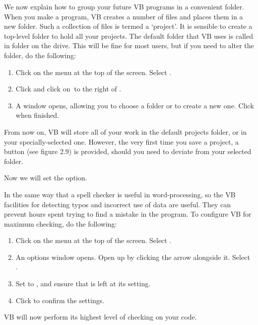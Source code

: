		We now explain how to group your future VB programs in a convenient folder. When you make a program, VB creates a number of files and places them in a new folder. Such a collection of files is termed a ‘project’. It is sensible to create a top-level folder to hold all your projects. The default folder that VB uses is called  in  folder on the  drive. This will be fine for most users, but if you need to alter the folder, do the following:
		\begin{enumerate}
			\item	Click on the  menu at the top of the screen. Select .
			\item	Click  and click on  to the right of .
			\item	A  window opens, allowing you to choose a folder or to create a new one. Click  when finished.
		\end{enumerate}
		From now on, VB will store all of your work in the default projects folder, or in your specially-selected one. However, the very first time you save a project, a  button (see figure 2.9) is provided, should you need to deviate from your selected folder.

		Now we will set the  option.
		
		In the same way that a spell checker is useful in word-processing, so the VB facilities for detecting typos and incorrect use of data are useful. They can prevent hours spent trying to find a mistake in the program. To configure VB for maximum checking, do the following:
		\begin{enumerate}
			\item	Click on the  menu at the top of the screen. Select .
			\item	An options window opens. Open up  by clicking the arrow alongside it. Select .
			\item	Set  to , and ensure that  is left at its  setting.
			\item	Click  to confirm the settings.
		\end{enumerate}
		VB will now perform its highest level of checking on your code.

